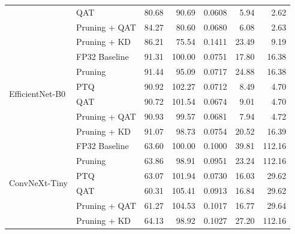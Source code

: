 \begin{table}[htbp]
{\begin{tabular}{llrrrrr}
  & QAT & 80.68 & 90.69 & 0.0608 & 5.94 & 2.62 \\
  & Pruning + QAT & 84.27 & 80.60 & 0.0680 & 6.08 & 2.63 \\
  & Pruning + KD & 86.21 & 75.54 & 0.1411 & 23.49 & 9.19 \\
\midrule
\multirow{6}{*}{EfficientNet-B0}
  & FP32 Baseline & 91.31 & 100.00 & 0.0751 & 17.80 & 16.38 \\
  & Pruning & 91.44 & 95.09 & 0.0717 & 24.88 & 16.38 \\
  & PTQ & 90.92 & 102.27 & 0.0712 & 8.49 & 4.70 \\
  & QAT & 90.72 & 101.54 & 0.0674 & 9.01 & 4.70 \\
  & Pruning + QAT & 90.93 & 99.57 & 0.0681 & 7.94 & 4.72 \\
  & Pruning + KD & 91.07 & 98.73 & 0.0754 & 20.52 & 16.39 \\
\midrule
\multirow{6}{*}{ConvNeXt-Tiny}
  & FP32 Baseline & 63.60 & 100.00 & 0.1000 & 39.81 & 112.16 \\
  & Pruning & 63.86 & 98.91 & 0.0951 & 23.24 & 112.16 \\
  & PTQ & 63.07 & 101.94 & 0.0730 & 16.03 & 29.62 \\
  & QAT & 60.31 & 105.41 & 0.0913 & 16.84 & 29.62 \\
  & Pruning + QAT & 61.27 & 104.53 & 0.1017 & 16.77 & 29.64 \\
  & Pruning + KD & 64.13 & 98.92 & 0.1027 & 27.20 & 112.16 \\
\bottomrule
\end{tabular}%
}
\end{table}